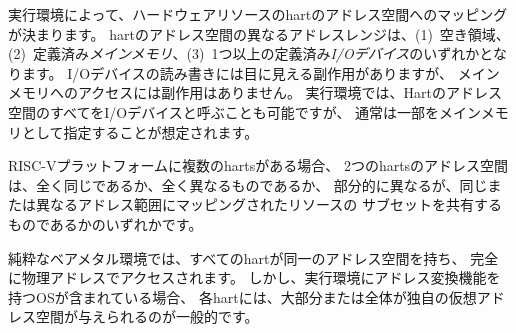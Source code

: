 \begin{comment}
The execution environment determines the mapping of hardware resources into
a hart's address space.
Different address ranges of a hart's address space may (1)~be vacant, or
(2)~contain {\em main memory}, or (3)~contain one or more {\em I/O devices}.
Reads and writes of I/O devices may have visible side effects, but accesses
to main memory cannot.
Although it is possible for the execution environment to call everything in
a hart's address space an I/O device, it is usually expected that some
portion will be specified as main memory.
\end{comment}

実行環境によって、ハードウェアリソースのhartのアドレス空間へのマッピングが決まります。
hartのアドレス空間の異なるアドレスレンジは、(1)~空き領域、(2)~定義済み{\em メインメモリ}、(3)~1つ以上の定義済み{\em I/Oデバイス}のいずれかとなります。
I/Oデバイスの読み書きには目に見える副作用がありますが、
メインメモリへのアクセスには副作用はありません。
実行環境では、Hartのアドレス空間のすべてをI/Oデバイスと呼ぶことも可能ですが、
通常は一部をメインメモリとして指定することが想定されます。

\begin{comment}
When a RISC-V platform has multiple harts, the address spaces of any two
harts may be entirely the same, or entirely different, or may be partly
different but sharing some subset of resources, mapped into the same or
different address ranges.
\end{comment}

RISC-Vプラットフォームに複数のhartsがある場合、
2つのhartsのアドレス空間は、全く同じであるか、全く異なるものであるか、
部分的に異なるが、同じまたは異なるアドレス範囲にマッピングされたリソースの
サブセットを共有するものであるかのいずれかです。

\begin{comment}
\begin{commentary}
For a purely ``bare metal'' environment, all harts may see an identical
address space, accessed entirely by physical addresses.
However, when the execution environment includes an operating system
employing address translation, it is common for each hart to be given a
virtual address space that is largely or entirely its own.
\end{commentary}
\end{comment}

\begin{commentary}
純粋なベアメタル環境では、すべてのhartが同一のアドレス空間を持ち、
完全に物理アドレスでアクセスされます。
しかし、実行環境にアドレス変換機能を持つOSが含まれている場合、
各hartには、大部分または全体が独自の仮想アドレス空間が与えられるのが一般的です。
\end{commentary}

